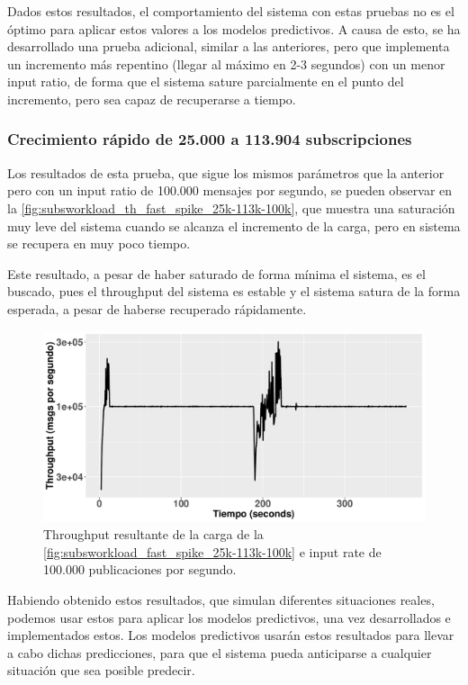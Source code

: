 Dados estos resultados, el comportamiento del sistema con estas pruebas no es el óptimo
para aplicar estos valores a los modelos predictivos. A causa de esto, se ha desarrollado
una prueba adicional, similar a las anteriores, pero que implementa un incremento más
repentino (llegar al máximo en 2-3 segundos) con un menor input ratio, de forma que el
sistema sature parcialmente en el punto del incremento, pero sea capaz de recuperarse
a tiempo.

\subsubsection*{Crecimiento rápido de 25.000 a 113.904 subscripciones}

Los resultados de esta prueba, que sigue los mismos parámetros que la anterior pero con un
input ratio de 100.000 mensajes por segundo, se pueden observar en la
\autoref{fig:subsworkload_th_fast_spike_25k-113k-100k}, que muestra una saturación muy leve del
sistema cuando se alcanza el incremento de la carga, pero en sistema se recupera en muy poco tiempo.

Este resultado, a pesar de haber saturado de forma mínima el sistema, es el buscado, pues el
throughput del sistema es estable y el sistema satura de la forma esperada, a pesar de haberse
recuperado rápidamente.

\begin{figure}[htpb]
    \centering
    \includegraphics[width=\textwidth]{images/th_test_spike_25k-113k_100000.pdf}
    \caption{Throughput resultante de la carga de la \autoref{fig:subsworkload_fast_spike_25k-113k-100k} e input rate de 100.000 publicaciones por segundo.}
    \label{fig:subsworkload_th_fast_spike_25k-113k-100k}
\end{figure}

Habiendo obtenido estos resultados, que simulan diferentes situaciones
reales, podemos usar estos para aplicar los modelos predictivos, una vez
desarrollados e implementados estos. Los modelos predictivos usarán estos 
resultados para llevar a cabo dichas predicciones, para que el sistema pueda
anticiparse a cualquier situación que sea posible predecir.